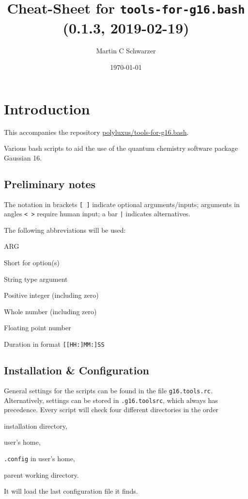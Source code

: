 \documentclass[   %
  final,          %
  a4paper,        %
  rscols=3,       %
  margin=1.0cm,   %
]{refsheet}
\title{Cheat-Sheet for \texttt{tools-for-g16.bash} (0.1.3, 2019-02-19)}
\author{Martin C Schwarzer}
\date{\today}
\begin{document}
\maketitle

\section{Introduction}

This accompanies the repository \href{https://github.com/polyluxus/tools-for-g16.bash}{polyluxus/tools-for-g16.bash}.

Various bash scripts to aid the use of the quantum chemistry software package Gaussian 16.

\subsection{Preliminary notes}

The notation in brackets \texttt{[ ]} indicate optional arguments/inputs;
arguments in angles \texttt{< >} require human input;
a bar \texttt{|} indicates alternatives.

The following abbreviations will be used:
\begin{rslisttt}{ARG}
  \item[opt] Short for option(s)
  \item[ARG] String type argument
  \item[INT] Positive integer (including zero)
  \item[NUM] Whole number (including zero)
  \item[FLT] Floating point number
  \item[DUR] Duration in format \texttt{[[HH:]MM:]SS} 
\end{rslisttt}

\subsection{Installation \& Configuration}

General settings for the scripts can be found in the file \texttt{g16.tools.rc}.
Alternatively, settings can be stored in \texttt{.g16.toolsrc}, 
which always has precedence.
Every script will check four different directories in the order
\begin{enumerate*}
\item installation directory,
\item user's home,
\item \texttt{.config} in user's home,
\item parent working directory.
\end{enumerate*}
It will load the last configuration file it finds.
\end{document}
